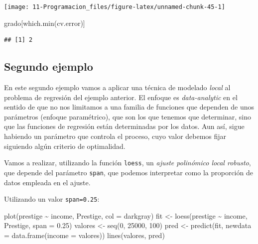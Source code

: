 \documentclass[
]{book}
\newenvironment{Shaded}{\begin{snugshade}}{\end{snugshade}}
\newcommand{\AttributeTok}[1]{\textcolor[rgb]{0.77,0.63,0.00}{#1}}
\newcommand{\DecValTok}[1]{\textcolor[rgb]{0.00,0.00,0.81}{#1}}
\newcommand{\FloatTok}[1]{\textcolor[rgb]{0.00,0.00,0.81}{#1}}
\newcommand{\FunctionTok}[1]{\textcolor[rgb]{0.00,0.00,0.00}{#1}}
\newcommand{\NormalTok}[1]{#1}
\newcommand{\OtherTok}[1]{\textcolor[rgb]{0.56,0.35,0.01}{#1}}
\newcommand{\SpecialCharTok}[1]{\textcolor[rgb]{0.00,0.00,0.00}{#1}}
\newcommand{\StringTok}[1]{\textcolor[rgb]{0.31,0.60,0.02}{#1}}
\theoremstyle{break}
\begin{document}
\begin{center}\texttt{[image: 11-Programacion\_files/figure-latex/unnamed-chunk-45-1]} \end{center}

\begin{Shaded}
\begin{Highlighting}[]
\NormalTok{grado[}\FunctionTok{which.min}\NormalTok{(cv.error)]}
\end{Highlighting}
\end{Shaded}

\begin{verbatim}
## [1] 2
\end{verbatim}

\hypertarget{segundo-ejemplo}{%
\subsection{Segundo ejemplo}\label{segundo-ejemplo}}

En este segundo ejemplo vamos a aplicar una técnica de modelado \emph{local} al problema de
regresión del ejemplo anterior.
El enfoque es \emph{data-analytic} en el sentido de que no nos limitamos a una
familia de funciones que dependen de unos parámetros (enfoque paramétrico),
que son los que tenemos que determinar, sino que las funciones de
regresión están determinadas por los datos. Aun así, sigue habiendo un
parámetro que controla el proceso, cuyo valor debemos fijar siguiendo
algún criterio de optimalidad.

Vamos a realizar, utilizando la función \texttt{loess}, un \emph{ajuste polinómico local
robusto}, que depende del parámetro \texttt{span}, que podemos interpretar como la
proporción de datos empleada en el ajuste.

Utilizando un valor \texttt{span=0.25}:

\begin{Shaded}
\begin{Highlighting}[]
\FunctionTok{plot}\NormalTok{(prestige }\SpecialCharTok{\textasciitilde{}}\NormalTok{ income, Prestige, }\AttributeTok{col =} \StringTok{\textquotesingle{}darkgray\textquotesingle{}}\NormalTok{)}
\NormalTok{fit }\OtherTok{\textless{}{-}} \FunctionTok{loess}\NormalTok{(prestige }\SpecialCharTok{\textasciitilde{}}\NormalTok{ income, Prestige, }\AttributeTok{span =} \FloatTok{0.25}\NormalTok{)}
\NormalTok{valores }\OtherTok{\textless{}{-}} \FunctionTok{seq}\NormalTok{(}\DecValTok{0}\NormalTok{, }\DecValTok{25000}\NormalTok{, }\DecValTok{100}\NormalTok{)}
\NormalTok{pred }\OtherTok{\textless{}{-}} \FunctionTok{predict}\NormalTok{(fit, }\AttributeTok{newdata =} \FunctionTok{data.frame}\NormalTok{(}\AttributeTok{income =}\NormalTok{ valores))}
\FunctionTok{lines}\NormalTok{(valores, pred)}
\end{Highlighting}
\end{Shaded}
\end{document}
